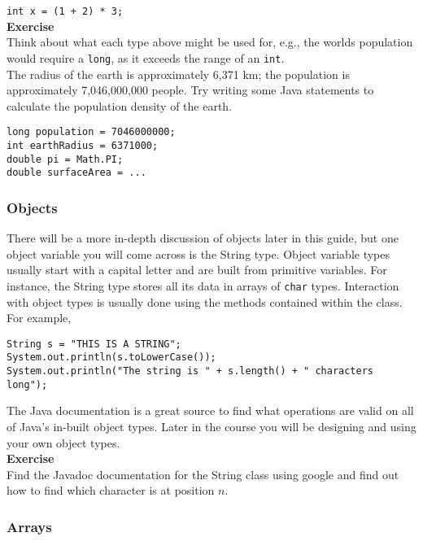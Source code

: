 \indent
{\tt int x = (1 + 2) * 3;}\\

\noindent
{\bf Exercise}\\

\noindent
Think about what each type above might be used for, e.g., the worlds population would require a {\tt long}, as it exceeds the range of an {\tt int}.\\

\noindent
The radius of the earth is approximately 6,371 km; the population is approximately 7,046,000,000 people. Try writing some Java statements to calculate the population density of the earth.

\begin{verbatim}
long population = 7046000000;
int earthRadius = 6371000;
double pi = Math.PI;
double surfaceArea = ...
\end{verbatim}

\subsubsection*{Objects}

There will be a more in-depth discussion of objects later in this guide, but one object variable you will come across is the String type. Object variable types usually start with a capital letter and are built from primitive variables. For instance, the String type stores all its data in arrays of {\tt char} types. Interaction with object types is usually done using the methods contained within the class. For example,

\begin{verbatim}
String s = "THIS IS A STRING";
System.out.println(s.toLowerCase());
System.out.println("The string is " + s.length() + " characters long");
\end{verbatim}

\noindent
The Java documentation is a great source to find what operations are valid on all of Java's in-built object types. Later in the course you will be designing and using your own object types.\\

\noindent
{\bf Exercise}\\

\noindent
Find the Javadoc documentation for the String class using google and find out how to find which character is at position $n$.

\subsubsection*{Arrays}

